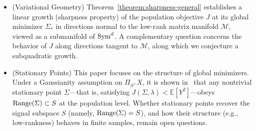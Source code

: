 \documentclass[sn-mathphys-num]{sn-jnl}%
\numberwithin{equation}{section}
\newcommand{\Range}{{\rm Range}}
\newcommand{\Sym}{{\rm \mathrm{Sym}}}
\theoremstyle{thmstyleone}%
\theoremstyle{thmstyletwo}%
\theoremstyle{thmstylethree}%
\begin{document}
\vspace{.5em} 
\begin{itemize}
\item (Variational Geometry) 
Theorem~\ref{theorem:sharpness-general} establishes a linear growth (sharpness property) of the population objective $J$ at its global minimizer $\Sigma_*$ in directions normal to the low-rank matrix manifold $\mathcal M$, viewed as a submanifold of $\Sym^d$.  A  complementary question concerns the behavior of $J$ along directions tangent to $\mathcal M$, along which we conjecture a subquadratic growth.


\vspace{.5em}
\item (Stationary Points) 
This paper focuses on the structure of global minimizers. Under a Gaussianity assumption on $\Pi_{S^\perp} X$, it is shown in~\cite{LiRub25} that any nontrivial stationary point $\Sigma$---that is, satisfying $J(\Sigma,\lambda) < \mathbb{E}[Y^2]$---obeys $\Range(\Sigma) \subset S$ at the population level. Whether stationary points recover the signal subspace $S$ (namely, $\Range(\Sigma) = S$), and how their structure (e.g., low-rankness) behaves in finite samples, remain open questions.



\end{itemize}
\end{document}
